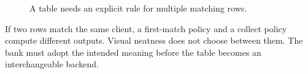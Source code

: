 \begin{figure}[H]
\centering
{}
\caption{A table needs an explicit rule for multiple matching rows.}\label{fig:teach-M04-09}
\end{figure}

If two rows match the same client, a first-match policy and a collect policy compute different outputs. Visual neatness does not choose between them. The bank must adopt the intended meaning before the table becomes an interchangeable backend.

